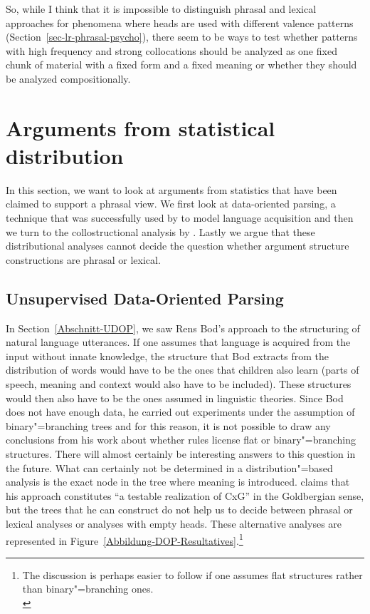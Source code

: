 \begin{exe}
\begin{xlist}[iv.]
\begin{exe}
\begin{xlist}[iv.]
So, while I think that it is impossible to distinguish phrasal and lexical approaches for phenomena
where heads are used with different valence patterns (Section~\ref{sec-lr-phrasal-psycho}), there seem to be ways to test whether patterns
with high frequency and strong collocations should be analyzed as one fixed chunk of material with a
fixed form and a fixed meaning or whether they should be analyzed compositionally.




\section{Arguments from statistical distribution}
\label{stat-sec}

In this section, we want to look at arguments from statistics that have been claimed to support a phrasal
view.  We first look at data-oriented parsing, a technique that was successfully used by
\citet{Bod2009a} to model language acquisition and then we turn to the collostructional analysis by
\citet{SG2009a}.  Lastly we argue that these distributional analyses cannot decide the question
whether argument structure constructions are phrasal or lexical.

\subsection{Unsupervised Data-Oriented Parsing}
\label{Abschnitt-U-Dop-phrasal}


In Section~\ref{Abschnitt-UDOP}, we saw Rens Bod's approach to the structuring of natural language utterances.
If one assumes that language is acquired from the input without innate knowledge, the structure that Bod extracts from the distribution of words would have to be the ones
that children also learn (parts of speech, meaning and context would also have to be included).
These structures would then also have to be the ones assumed in linguistic theories. Since Bod does not have enough data, he carried out experiments under the assumption of binary"=branching
trees and for this reason, it is not possible to draw any conclusions from his work about whether rules license flat or binary"=branching structures.
There will almost certainly be interesting answers to this question in the future. What can certainly not be determined in a distribution"=based analysis is the exact node in the tree
where meaning is introduced. \citet[]{Bod2009b} claims that his approach constitutes ``a testable realization of CxG'' in the Goldbergian sense, but the trees that he can construct do not help us to decide between
phrasal or lexical analyses or analyses with empty heads. These alternative analyses are represented in Figure~\vref{Abbildung-DOP-Resultatives}.\footnote{
The discussion is perhaps easier to follow if one assumes flat structures rather than binary"=branching ones.\\

}
\end{xlist}
\end{exe}
\end{xlist}
\end{exe}
